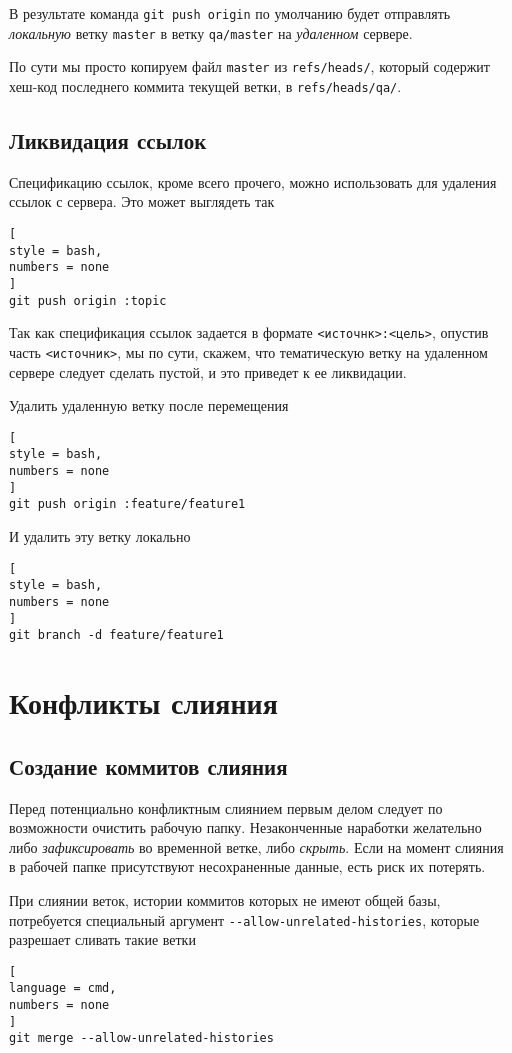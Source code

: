 \documentclass[%
	11pt,
	a4paper,
	utf8,
		]{article}
\begin{document}
В результате команда \texttt{git push origin} по умолчанию будет отправлять \emph{локальную} ветку \texttt{master} в ветку \verb|qa/master| на \emph{удаленном} сервере.

По сути мы просто копируем файл \texttt{master} из \verb|refs/heads/|, который содержит хеш-код последнего коммита текущей ветки, в \verb|refs/heads/qa/|.

\subsection{Ликвидация ссылок}

Спецификацию ссылок, кроме всего прочего, можно использовать для удаления ссылок с сервера. Это может выглядеть так
\begin{lstlisting}[
style = bash,
numbers = none
]
git push origin :topic
\end{lstlisting}

Так как спецификация ссылок задается в формате \verb|<источнк>:<цель>|, опустив часть \verb|<источник>|, мы по сути, скажем, что тематическую ветку на удаленном сервере следует сделать пустой, и это приведет к ее ликвидации.

Удалить удаленную ветку после перемещения
\begin{lstlisting}[
style = bash,
numbers = none
]
git push origin :feature/feature1
\end{lstlisting}

И удалить эту ветку локально
\begin{lstlisting}[
style = bash,
numbers = none
]
git branch -d feature/feature1
\end{lstlisting}



\section{Конфликты слияния}

\subsection{Создание коммитов слияния}

Перед потенциально конфликтным слиянием первым делом следует по возможности очистить рабочую папку. Незаконченные наработки желательно либо \emph{зафиксировать} во временной ветке, либо \emph{скрыть}. Если на момент слияния в рабочей папке присутствуют несохраненные данные, есть риск их потерять.

При слиянии веток, истории коммитов которых не имеют общей базы, потребуется специальный аргумент \verb|--allow-unrelated-histories|, которые разрешает сливать такие ветки
\begin{lstlisting}[
language = cmd,
numbers = none
]
git merge --allow-unrelated-histories
\end{lstlisting}
\end{document}
